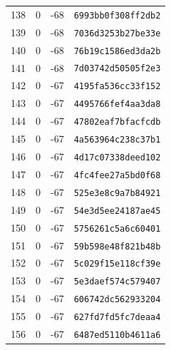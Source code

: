 {\begin{longtable}{@{}rrrl@{}}
138 & 0 & -68 & \texttt{6993bb0f308ff2db2} \\
139 & 0 & -68 & \texttt{7036d3253b27be33e} \\
140 & 0 & -68 & \texttt{76b19c1586ed3da2b} \\
141 & 0 & -68 & \texttt{7d03742d50505f2e3} \\
142 & 0 & -67 & \texttt{4195fa536cc33f152} \\
143 & 0 & -67 & \texttt{4495766fef4aa3da8} \\
144 & 0 & -67 & \texttt{47802eaf7bfacfcdb} \\
145 & 0 & -67 & \texttt{4a563964c238c37b1} \\
146 & 0 & -67 & \texttt{4d17c07338deed102} \\
147 & 0 & -67 & \texttt{4fc4fee27a5bd0f68} \\
148 & 0 & -67 & \texttt{525e3e8c9a7b84921} \\
149 & 0 & -67 & \texttt{54e3d5ee24187ae45} \\
150 & 0 & -67 & \texttt{5756261c5a6c60401} \\
151 & 0 & -67 & \texttt{59b598e48f821b48b} \\
152 & 0 & -67 & \texttt{5c029f15e118cf39e} \\
153 & 0 & -67 & \texttt{5e3daef574c579407} \\
154 & 0 & -67 & \texttt{606742dc562933204} \\
155 & 0 & -67 & \texttt{627fd7fd5fc7deaa4} \\
156 & 0 & -67 & \texttt{6487ed5110b4611a6} \\
\bottomrule
\end{longtable}
}
